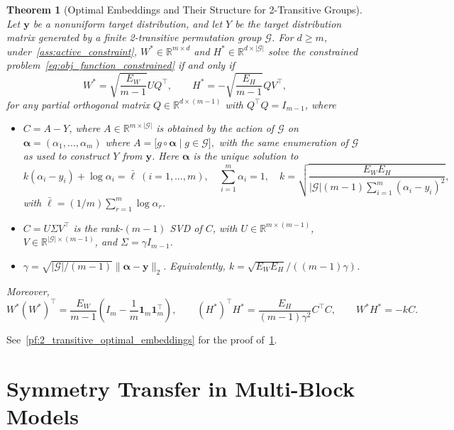 \documentclass[11pt]{article}
\newtheorem{theorem}{Theorem}
\begin{document}
\begin{theorem}[Optimal Embeddings and Their Structure for 2-Transitive Groups]
\label{thm:2_transitive_optimal_embeddings}
Let \(\boldsymbol{y}\) be a nonuniform target distribution, and let \(Y\) be the target distribution matrix generated by a finite 2-transitive permutation group \(\mathcal G\).
For \(d\ge m\), under~\cref{ass:active_constraint},
\(W^*\in\mathbb{R}^{m\times d}\) and \(H^*\in\mathbb{R}^{d\times |\mathcal G|}\) solve the constrained
problem~\cref{eq:obj_function_constrained} if and only if
\[
  W^*=\sqrt{\frac{E_W}{m-1}} UQ^\top,\qquad
  H^*=-\sqrt{\frac{E_H}{m-1}} QV^\top,
\]
for any partial orthogonal matrix \(Q\in\mathbb{R}^{d\times(m-1)}\) with \(Q^\top Q=I_{m-1}\), where
\begin{itemize}
\item \(C=A-Y\), where \(A\in\mathbb{R}^{m\times |\mathcal G|}\) is obtained by the action of \(\mathcal G\) on \(\boldsymbol{\alpha}=(\alpha_1,\ldots,\alpha_m)\) where
\( A=\big[ g\circ\boldsymbol{\alpha}\mid g\in \mathcal G \big],
\)
with the same enumeration of \(\mathcal G\) as used to construct \(Y\) from \(\boldsymbol{y}\).
Here \(\boldsymbol{\alpha}\) is the unique solution to
\[
k(\alpha_i-y_i)+\log\alpha_i=\bar{\ell}\ (i=1,\dots,m),\quad \sum_{i=1}^m\alpha_i=1,\quad
k=\sqrt{\frac{E_W E_H}{|\mathcal G|(m-1)\sum_{i=1}^m(\alpha_i-y_i)^2}},
\]
with \(\bar{\ell}=(1/m)\sum_{r=1}^m \log \alpha_r\).
\item \(C=U\Sigma V^\top\) is the rank-\((m-1)\) SVD of \(C\), with \(U\in\mathbb{R}^{m\times(m-1)}\), \(V\in\mathbb{R}^{|\mathcal G|\times(m-1)}\), and \(\Sigma=\gamma I_{m-1}\).
\item  \( \gamma = \sqrt{|\mathcal G|/(m-1)}\|\boldsymbol{\alpha}-\boldsymbol{y}\|_2\). Equivalently, \(k=\sqrt{E_W E_H}/((m-1)\gamma)\).
\end{itemize}
Moreover,
\[
  W^*(W^*)^\top=\frac{E_W}{m-1} \left(I_m-\frac{1}{m}\boldsymbol{1}_m\boldsymbol{1}_m^\top\right),\qquad
  (H^*)^\top H^*=\frac{E_H}{(m-1)\gamma^2} C^\top C,\qquad
  W^*H^*=-k C.
\]
\end{theorem}

See~\cref{pf:2_transitive_optimal_embeddings} for the proof of~\cref{thm:2_transitive_optimal_embeddings}.

\section{Symmetry Transfer in Multi-Block Models}\label{sec:multi_block}
\end{document}
